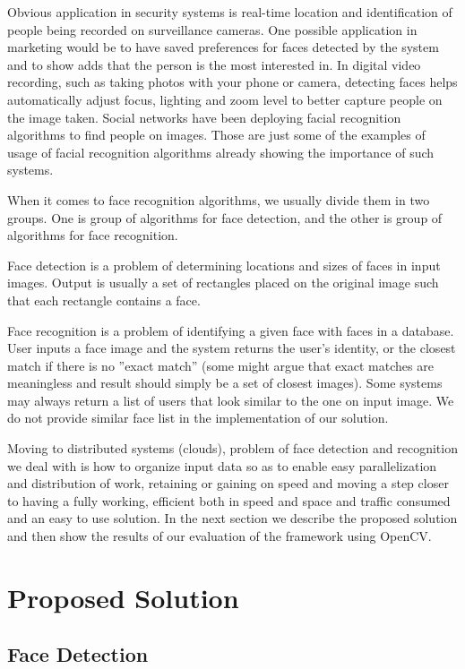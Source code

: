 \documentclass[11pt, draftclsnofoot, onecolumn]{IEEEtran}
\begin{document}
Obvious application in security systems is real-time location and identification of people being recorded on surveillance cameras. One possible application in marketing would be to have saved preferences for faces detected by the system and to show adds that the person is the most interested in. In digital video recording, such as taking photos with your phone or camera, detecting faces helps automatically adjust focus, lighting and zoom level to better capture people on the image taken. Social networks have been deploying facial recognition algorithms to find people on images. Those are just some of the examples of usage of facial recognition algorithms already showing the importance of such systems.

When it comes to face recognition algorithms, we usually divide them in two groups. One is group of algorithms for face detection, and the other is group of algorithms for face recognition.

Face detection is a problem of determining locations and sizes of faces in input images. Output is usually a set of rectangles placed on the original image such that each rectangle contains a face.

Face recognition is a problem of identifying a given face with faces in a database. User inputs a face image and the system returns the user's identity, or the closest match if there is no ''exact match'' (some might argue that exact matches are meaningless and result should simply be a set of closest images). Some systems may always return a list of users that look similar to the one on input image. We do not provide similar face list in the implementation of our solution.

Moving to distributed systems (clouds), problem of face detection and recognition we deal with is how to organize input data so as to enable easy parallelization and distribution of work, retaining or gaining on speed and moving a step closer to having a fully working, efficient both in speed and space and traffic consumed and an easy to use solution. In the next section we describe the proposed solution and then show the results of our evaluation of the framework using OpenCV.

\section{Proposed Solution} \label{sec:solution}

\subsection{Face Detection}
\end{document}
